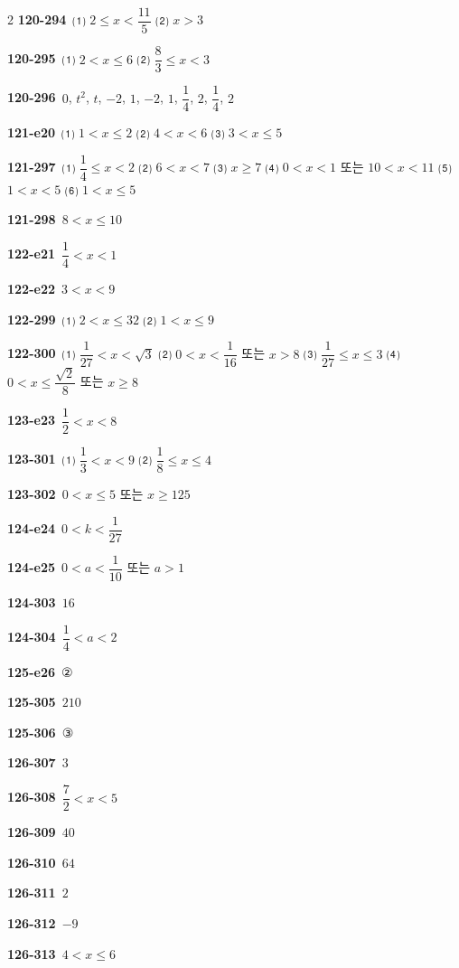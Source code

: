 \documentclass[10pt,a4paper]{article}
\begin{document}
\begin{multicols}{2}
\noindent\textbf{120-294}\ ⑴ $2\le x<\dfrac{11}{5}$ ⑵ $x>3$\par
\noindent\textbf{120-295}\ ⑴ $2<x\le 6$ ⑵ $\dfrac{8}{3}\le x<3$\par
\noindent\textbf{120-296}\ $0$, $t^2$, $t$, $-2$, $1$, $-2$, $1$, $\dfrac{1}{4}$, $2$, $\dfrac{1}{4}$, $2$\par
\noindent\textbf{121-e20}\ ⑴ $1<x\le 2$ ⑵ $4<x<6$ ⑶ $3<x\le 5$\par
\noindent\textbf{121-297}\ ⑴ $\dfrac{1}{4}\le x<2$ ⑵ $6<x<7$ ⑶ $x\ge 7$ ⑷ $0<x<1$ 또는 $10<x<11$ ⑸ $1<x<5$ ⑹ $1<x\le 5$\par
\noindent\textbf{121-298}\ $8<x\le 10$\par
\noindent\textbf{122-e21}\ $\dfrac{1}{4}<x<1$\par
\noindent\textbf{122-e22}\ $3<x<9$\par
\noindent\textbf{122-299}\ ⑴ $2<x\le 32$ ⑵ $1<x\le 9$\par
\noindent\textbf{122-300}\ ⑴ $\dfrac{1}{27}<x<\sqrt{3}$ ⑵ $0<x<\dfrac{1}{16}$ 또는 $x>8$ ⑶ $\dfrac{1}{27}\le x\le 3$ ⑷ $0<x\le\dfrac{\sqrt{2}}{8}$ 또는 $x\ge 8$\par
\noindent\textbf{123-e23}\ $\dfrac{1}{2}<x<8$\par
\noindent\textbf{123-301}\ ⑴ $\dfrac{1}{3}<x<9$ ⑵ $\dfrac{1}{8}\le x\le 4$\par
\noindent\textbf{123-302}\ $0<x\le 5$ 또는 $x\ge 125$\par
\noindent\textbf{124-e24}\ $0<k<\dfrac{1}{27}$\par
\noindent\textbf{124-e25}\ $0<a<\dfrac{1}{10}$ 또는 $a>1$\par
\noindent\textbf{124-303}\ $16$\par
\noindent\textbf{124-304}\ $\dfrac{1}{4}<a<2$\par
\noindent\textbf{125-e26}\ ②\par
\noindent\textbf{125-305}\ $210$\par
\noindent\textbf{125-306}\ ③\par
\noindent\textbf{126-307}\ $3$\par
\noindent\textbf{126-308}\ $\dfrac{7}{2}<x<5$\par
\noindent\textbf{126-309}\ $40$\par
\noindent\textbf{126-310}\ $64$\par
\noindent\textbf{126-311}\ $2$\par
\noindent\textbf{126-312}\ $-9$\par
\noindent\textbf{126-313}\ $4<x\le 6$\par

\end{multicols}
\end{document}
